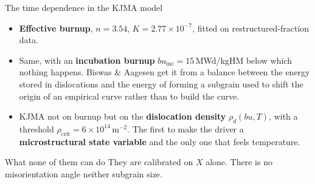 \documentclass[10pt,aspectratio=169]{beamer}
\begin{document}
\begin{frame}{The time dependence in the KJMA model}
  \small
  \begin{itemize}
    \item[\textbf{1}] \textbf{Effective burnup}, $n = 3.54$, $K = 2.77\times10^{-7}$, fitted on
      restructured-fraction data. 
    \item[\textbf{2}] Same, with an \textbf{incubation burnup} $bu_{\text{inc}} = 15$\,MWd/kgHM
      below which nothing happens. Biswas \& Aagesen get it from a balance between the energy
      stored in dislocations and the energy of forming a subgrain used to shift the origin of an empirical curve rather than to
      build the curve.
    \item[\textbf{3}] KJMA not on burnup but on the \textbf{dislocation density}
      $\rho_d(bu,T)$, with a threshold $\rho_{\text{crit}} = 6\times10^{14}$\,m$^{-2}$.
      The first to make the driver a \textbf{microstructural state variable} and the only one 
       that feels temperature.
  \end{itemize}

  \begin{block}{What none of them can do}
    They are calibrated on $X$ alone. There is no misorientation angle neither subgrain size.
  \end{block}
\end{frame}
\end{document}
